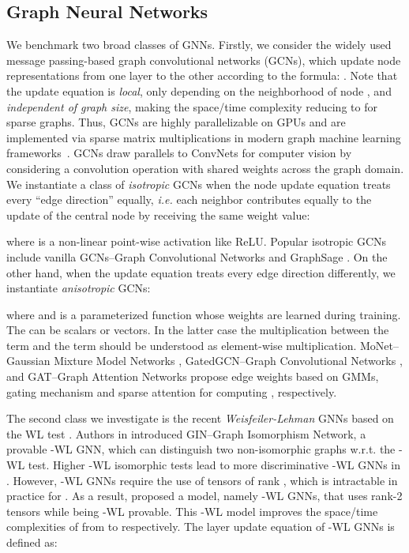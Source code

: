 \documentclass{article}
\begin{document}
\subsection{Graph Neural Networks}
\label{sec:gnns}
We benchmark two broad classes of GNNs. Firstly, we consider the widely used message passing-based graph convolutional networks (GCNs), which update node representations from one layer to the other according to the formula: .
Note that the update equation is {\it local}, only depending on the neighborhood  of node , and {\it independent of graph size}, making the space/time complexity  reducing to  for sparse graphs.
Thus, GCNs are highly parallelizable on GPUs and are implemented via sparse matrix multiplications in modern graph machine learning frameworks~\cite{wang2019dgl,fey2019fast}.
GCNs draw parallels to ConvNets for computer vision \cite{lecun1998gradient} by considering a convolution operation with shared weights across the graph domain.
We instantiate a class of {\it isotropic} GCNs when the node update equation treats every “edge direction” equally, \textit{i.e.} each neighbor contributes equally to the update of the central node by receiving the same weight value:

where  is a non-linear point-wise activation like ReLU. 
Popular isotropic GCNs include vanilla GCNs--Graph Convolutional Networks \cite{NIPS2016_6398,kipf2017semi} and GraphSage \cite{hamilton2017inductive}. 
On the other hand, when the update equation treats every edge direction differently, 
we instantiate {\it anisotropic} GCNs:

where   and  is a parameterized function whose weights are learned during training. The  can be scalars or vectors. In the latter case the multiplication between the term  and the term   should be understood as element-wise multiplication. 
MoNet--Gaussian Mixture Model Networks \cite{Monti_2017}, GatedGCN--Graph Convolutional Networks \cite{bresson2017residual}, and GAT--Graph Attention Networks \cite{velickovic2018graph} propose edge weights based on GMMs, gating mechanism and sparse attention for computing , respectively. 

The second class we investigate is the recent {\it Weisfeiler-Lehman} GNNs based on the WL test \cite{weisfeiler1968reduction}.  Authors in \cite{xu2018how} introduced GIN--Graph Isomorphism Network, a provable -WL GNN, which can distinguish two non-isomorphic graphs w.r.t. the -WL test.
Higher -WL isomorphic tests lead to more discriminative -WL GNNs in \cite{morris2019weisfeiler,maron2019provably}. However, -WL GNNs require the use of tensors of rank , which is intractable in practice for . As a result, \cite{maron2019provably} proposed a model, namely -WL GNNs, that uses rank-2 tensors while being -WL provable. This -WL model improves the space/time complexities of \cite{morris2019weisfeiler} from  to  respectively. The layer update equation 
of -WL GNNs is defined as:
\end{document}
